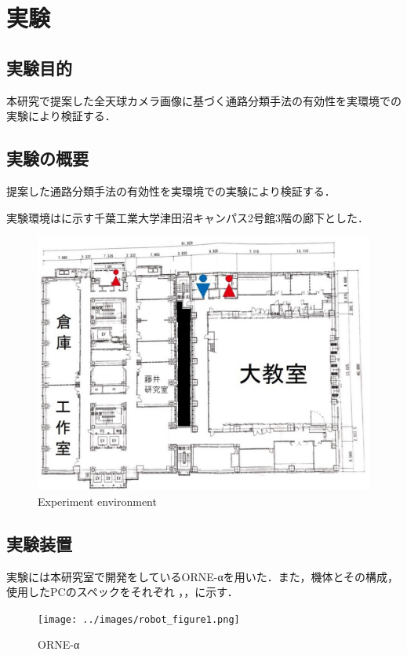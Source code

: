 \documentclass[../main]{subfiles}
\begin{document}
\setcounter{secnumdepth}{3}
    \chapter{実験}
    \section{実験目的}
        本研究で提案した全天球カメラ画像に基づく通路分類手法の有効性を実環境での実験により検証する．
    \section{実験の概要}
        提案した通路分類手法の有効性を実環境での実験により検証する．
        
        実験環境はに示す千葉工業大学津田沼キャンパス2号館3階の廊下とした．
        \begin{figure}[H]
         \centering
         \includegraphics[width=15cm]{../images/MAP_Tsudanuma2-3.png}
         \caption{Experiment environment}
         \label{figure::3floor_map}
        \end{figure}

    \section{実験装置}
        実験には本研究室で開発をしているORNE-αを用いた．また，機体とその構成，使用したPCのスペックをそれぞれ
        ，，に示す．

        \begin{figure}[H]
        \centering
        \texttt{[image: ../images/robot\_figure1.png]}
        \caption{ORNE-α}
        \label{figure::robot_image}
        \end{figure}
\end{document}
